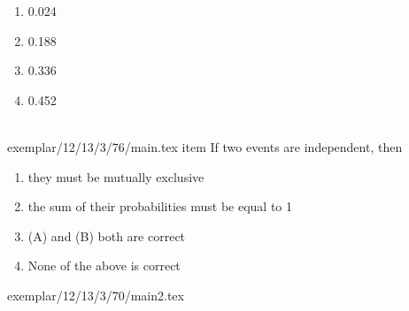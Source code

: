 \begin{enumerate}[label=\thesection.\arabic*,ref=\thesection.\theenumi]
\begin{enumerate}
\item 0.024
\item 0.188
\item 0.336
\item 0.452
\end{enumerate}
\solution \\
 {exemplar/12/13/3/76/main.tex}
item If two events are independent, then
\begin{enumerate}
\item they must be mutually exclusive
\item the sum of their probabilities must be equal to 1
\item (A) and (B) both are correct
\item None of the above is correct
\end{enumerate}
 {exemplar/12/13/3/70/main2.tex}
\end{enumerate}
